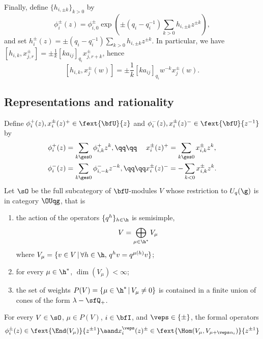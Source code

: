 \documentclass[reqno]{amsart}
\numberwithin{equation}{section}
\begin{document}
Finally, define $\{h_{i,\pm k}\}_{k>0}$ by
\begin{equation}\label{eq:log-phi}
\phi^{\pm}_i(z)
=
\phi^{\pm}_{i,0}
\exp\left(
\pm(q_i-q_i^{-1})
\sum_{k>0}h_{i,\pm k}z^{\pm k}
\right),
\end{equation}
and set $h^\pm_{i}(z)=\pm(q_i-q_i^{-1})
\sum_{k>0}h_{i,\pm k}z^{\pm k}$.
In particular, we have $[h_{i, k}, x^{\pm}_{j,r}]=\pm\frac{1}{k}[ka_{ij}]_{q_i}x^{\pm}_{j,r+k}$, hence
\begin{equation}\label{eq:adjoint-h}
[h_{i, k}, x^{\pm}_{j}(w)]=\pm\frac{1}{k}[ka_{ij}]_{q_i}w^{-k}x^{\pm}_j(w).
\end{equation}

\subsection{Representations and rationality \cite{beck-kac-96, hernandez-07}}  \label{sec:catO}
Define $\phi^{+}_i(z), x^{\pm}_i(z)^+\in\fext{\bfU}{z}$ and  $\phi^{-}_i(z), x^{\pm}_i(z)^-\in\fext{\bfU}{z^{-1}}$ by
\begin{align}\label{eq:QL-fields}
	\phi_{i}^{+}(z) &= \sum_{k \ges 0} \phi_{i,k}^{+} z^{k},
	\qq\qq \hspace{4.5mm}
	x_{i}^{\pm}(z)^+ = \sum_{k \ges 0} x_{i,k}^{\pm} z^{k},\\
	\phi_{i}^{-}(z) &= \sum_{k \ges 0} \phi_{i,-k}^{-} z^{-k},
	\qq\qq
	x_{i}^{\pm}(z)^- = -\sum_{k < 0} x_{i,k}^{\pm} z^{k}.
\end{align}
Let $\sO$ be the full subcategory of $\bfU$-modules $V$ whose restriction to $U_q(\g)$
is in category $\OUqg$, that is
\begin{enumerate}[label=(O\arabic*)]\itemsep0.25cm
\item the action of the operators $\{q^h\}_{h\in\h}$ is semisimple, \ie
\begin{equation}
	V=\bigoplus_{\mu\in\h^*}V_\mu	
\end{equation}
where $V_\mu=\{v\in V\,\vert\, \forall h\in\h,\,q^hv=q^{\mu(h)}v\}$;
\item for every $\mu\in\h^*$, $\dim(V_\mu)<\infty$;
\item the set of weights $P(V)=\{\mu\in\h^*\,\vert\,V_\mu\neq0\}$ is contained in a finite union of cones of the form $\lambda-\sfQ_+$.\\
\end{enumerate}
For every $V\in\sO$, $\mu\in P(V)$, $i\in\bfI$, and $\veps\in\{\pm\}$, the formal operators
\begin{equation}
\phi^\pm_i(z)\in\fext{\End(V_\mu)}{z^{\pm1}}
\aand
x^{\veps}_i(z)^{\pm}\in\fext{\Hom(V_\mu,V_{\mu+\veps\alpha_i})}{z^{\pm1}}
\end{equation}
\end{document}
